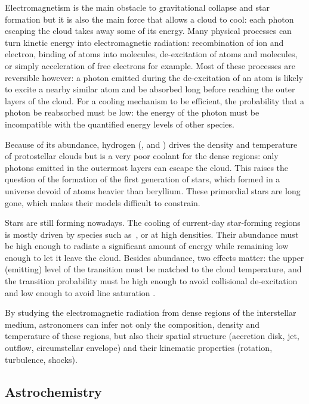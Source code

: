 Electromagnetism is the main obstacle to gravitational collapse and star formation but it is also the main force that allows a cloud to cool: each photon escaping the cloud takes away some of its energy.
Many physical processes can turn kinetic energy into electromagnetic radiation:
recombination of ion and electron, binding of atoms into molecules, de-excitation of atoms and molecules, or simply acceleration of free electrons for example.
Most of these processes are reversible however: a photon emitted during the de-excitation of an atom is likely to excite a nearby similar atom and be absorbed long before reaching the outer layers of the cloud.
For a cooling mechanism to be efficient, the probability that a photon be reabsorbed must be low: the energy of the photon must be incompatible with the quantified energy levels of other species.

Because of its abundance, hydrogen (,  and ) drives the density and temperature of protostellar clouds but is a very poor coolant for the dense regions: only photons emitted in the outermost layers can escape the cloud.
This raises the question of the formation of the first generation of stars,
which formed in a universe devoid of atoms heavier than beryllium.
These primordial stars are long gone, which makes their models difficult to constrain.

Stars are still forming nowadays.
The cooling of current-day star-forming regions is mostly driven by species such as~, or  at high densities.
Their abundance must be high enough to radiate a significant amount of energy while remaining low enough to let it leave the cloud.
Besides abundance, two effects matter: the upper (emitting) level of the transition must be matched to the cloud temperature, and the transition probability must be high enough to avoid collisional de-excitation and low enough to avoid line saturation
\autocite{tielens2005physics,draine2010physics}.

By studying the electromagnetic radiation from dense regions of the interstellar medium, astronomers can infer not only the composition, density and temperature of these regions, but also their spatial structure (accretion disk, jet, outflow, circumstellar envelope) and their kinematic properties (rotation, turbulence, shocks).



\subsection{Astrochemistry}

